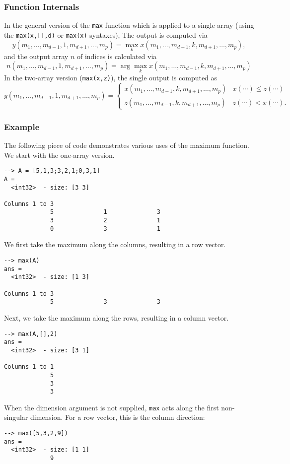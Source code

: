 \subsubsection{Function Internals}
In the general version of the \verb|max| function which is applied to
a single array (using the \verb|max(x,[],d)| or \verb|max(x)| syntaxes),
The output is computed via
\[
y(m_1,\ldots,m_{d-1},1,m_{d+1},\ldots,m_{p}) = 
\max_{k} x(m_1,\ldots,m_{d-1},k,m_{d+1},\ldots,m_{p}),
\]
and the output array $n$ of indices is calculated via
\[
n(m_1,\ldots,m_{d-1},1,m_{d+1},\ldots,m_{p}) = \arg
\max_{k} x(m_1,\ldots,m_{d-1},k,m_{d+1},\ldots,m_{p})
\]
In the two-array version (\verb|max(x,z)|), the single output is computed as
\[
  y(m_1,\ldots,m_{d-1},1,m_{d+1},\ldots,m_{p}) = 
\begin{cases}
  x(m_1,\ldots,m_{d-1},k,m_{d+1},\ldots,m_{p}) & x(\cdots) \leq z(\cdots) \\
  z(m_1,\ldots,m_{d-1},k,m_{d+1},\ldots,m_{p}) & z(\cdots) < x(\cdots).
\end{cases}
\]

\subsubsection{Example}
The following piece of code demonstrates various uses of the maximum
function.  We start with the one-array version.
\begin{verbatim}
--> A = [5,1,3;3,2,1;0,3,1]
A =
  <int32>  - size: [3 3]
  
Columns 1 to 3
             5              1              3
             3              2              1
             0              3              1
\end{verbatim}
We first take the maximum along the columns, resulting in a row vector.
\begin{verbatim}
--> max(A)
ans = 
  <int32>  - size: [1 3]
 
Columns 1 to 3
             5              3              3  
\end{verbatim}
Next, we take the maximum along the rows, resulting in a column vector.
\begin{verbatim}
--> max(A,[],2)
ans = 
  <int32>  - size: [3 1]
 
Columns 1 to 1
             5  
             3  
             3  
\end{verbatim}
When the dimension argument is not supplied, \verb|max| acts along the first non-singular dimension.  For a row vector, this is the column direction:
\begin{verbatim}
--> max([5,3,2,9])
ans = 
  <int32>  - size: [1 1]
             9  
\end{verbatim}

